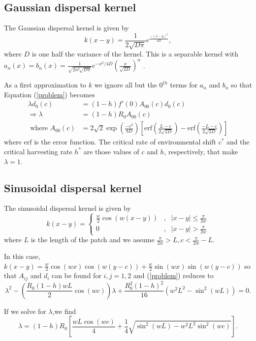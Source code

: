 \documentclass[12pt,english]{article}
\begin{document}
\subsection{Gaussian dispersal kernel \label{gausapp}}
The Gaussian dispersal kernel is given by
$$k(x-y)=\frac{1}{2\sqrt{D\pi}}e^{\frac{-(x-y)^2}{4D}},$$
where $D$ is one half the variance of the kernel.
This is a separable kernel with
$a_n(x)=b_n(x)=\frac{1}{\sqrt{2n!\sqrt{D\pi}}}e^{-x^2/4D}\left(\frac{x}{\sqrt{2D}}\right)^n$ \citep{Latore:1998fk}.

As a first approximation to $k$ we ignore all but the $0^{th}$ terms for $a_n$ and $b_n$ so that Equation (\ref{problem}) becomes
\begin{align*}
\lambda d_0(c)&=(1-h)f'(0)A_{00}(c)d_0(c)
\\ \Rightarrow \lambda&=(1-h)R_0A_{00}(c)
\\\text{ where } A_{00}(c)&=2\sqrt{2}\exp\left(\frac{-c^2}{8D}\right)\left[\text{erf}\left(\frac{L-c}{2\sqrt{2D}}\right)-\text{erf}\left(\frac{-L-c}{2\sqrt{2D}}\right)\right]
\end{align*}
where $\text{erf}$ is the error function.  The critical rate of environmental shift $c^*$ and the critical harvesting rate $h^*$ are those values of $c$ and $h$, respectively, that make $\lambda=1$.

\subsection{Sinusoidal dispersal kernel \label{sinapp}}
The sinusoidal dispersal kernel is given by 
$$k(x-y)=\left\{\begin{array}{ccccc}
\frac{w}{2}\cos(w(x-y)) & , & |x-y|\leq\frac{\pi}{2w}
\\ 0 & , & |x-y|>\frac{\pi}{2w}
\end{array}\right.
$$
where $L$ is the length of the patch and we assume $\frac{\pi}{2w}>L,c<\frac{\pi}{2w}-L$.

In this case, $k(x-y)=\frac{w}{2}\cos(wx)\cos(w(y-c))+\frac{w}{2}\sin(wx)\sin(w(y-c))$ so that $A_{ij}$ and $d_i$ can be found for $i,j=1,2$ and (\ref{problem}) reduces to 
$$\lambda^2-\left(\frac{R_0(1-h)wL}{2}\cos(wc)\right)\lambda+\frac{R_0^2(1-h)^2}{16}\left(w^2L^2-\sin^2(wL)\right)=0.$$

If we solve for $\lambda$,we find
\begin{equation*} \lambda=(1-h)R_0\left[\frac{wL\cos(wc)}{4}+\frac{1}{4}\sqrt{\sin^2(wL)-w^2L^2\sin^2(wc)}\right]. \label{cosine} \end{equation*}
\end{document}
